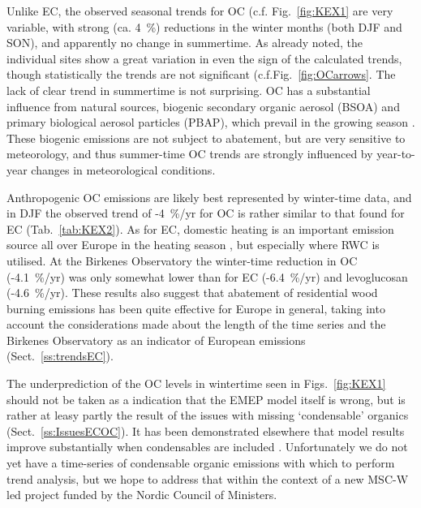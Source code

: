  

Unlike EC, the observed seasonal trends for OC (c.f. Fig.~\ref{fig:KEX1} are very variable, with strong (ca. 4~\%) reductions in the winter months (both DJF and SON), and apparently no change in summertime. As already noted, the individual sites show a great variation in even the sign of the calculated trends, though statistically the trends are not significant (c.f.Fig.~\ref{fig:OCarrows}. The lack of clear trend in summertime is not surprising. 
OC has a substantial influence from
natural sources, biogenic secondary organic aerosol (BSOA) and primary
biological aerosol particles (PBAP), which prevail in the growing season \citep[e.g.][]{Gelencser:CARB,Yttri2019}.
These biogenic emissions are not subject to abatement, but are very sensitive to meteorology, and thus summer-time OC trends are strongly influenced by year-to-year changes in meteorological conditions.

Anthropogenic OC emissions
are likely best represented by winter-time data, and in DJF the observed trend of -4~\%/yr for OC is rather similar to that found for EC (Tab.~\ref{tab:KEX2}). As
for EC, domestic heating is an important emission source 
all over Europe in the heating season
\citep[e.g.][]{Yttri2019}, but especially where RWC is utilised.
At the Birkenes
Observatory the winter-time reduction in OC (-4.1~\%/yr) was only somewhat
lower than for EC (-6.4~\%/yr) and levoglucosan (-4.6~\%/yr).
These results also suggest
that abatement of residential wood burning emissions has been quite
effective for Europe in general, taking into account the considerations
made about the length of the time series and the Birkenes Observatory as
an indicator of European emissions (Sect.~\ref{ss:trendsEC}).  

The underprediction of the OC levels in wintertime seen in Figs.~\ref{fig:KEX1} should not be taken as a indication that the EMEP model itself is wrong, but is rather at leasy partly the result of the issues with missing `condensable' organics (Sect.~\ref{ss:IssuesECOC}). It has been demonstrated elsewhere that model results improve substantially when condensables are included \citep{DeniervanderGon2015,R2019:SVOC,R2020:SVOC}. Unfortunately we do not yet have a time-series of condensable organic emissions with which to perform trend analysis, but we hope to address that within the context of a new MSC-W led project funded by the Nordic Council of Ministers.

